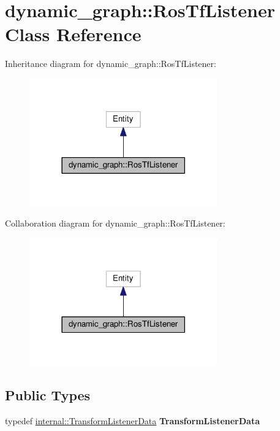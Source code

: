 \hypertarget{classdynamic__graph_1_1RosTfListener}{}\section{dynamic\+\_\+graph\+:\+:Ros\+Tf\+Listener Class Reference}
\label{classdynamic__graph_1_1RosTfListener}


Inheritance diagram for dynamic\+\_\+graph\+:\+:Ros\+Tf\+Listener\+:
\nopagebreak
\begin{figure}[H]
\begin{center}
\leavevmode
\includegraphics[width=230pt]{classdynamic__graph_1_1RosTfListener__inherit__graph}
\end{center}
\end{figure}


Collaboration diagram for dynamic\+\_\+graph\+:\+:Ros\+Tf\+Listener\+:
\nopagebreak
\begin{figure}[H]
\begin{center}
\leavevmode
\includegraphics[width=230pt]{classdynamic__graph_1_1RosTfListener__coll__graph}
\end{center}
\end{figure}
\subsection*{Public Types}
\begin{DoxyCompactItemize}
\item 
typedef \hyperlink{structdynamic__graph_1_1internal_1_1TransformListenerData}{internal\+::\+Transform\+Listener\+Data} {\bfseries Transform\+Listener\+Data}\hypertarget{classdynamic__graph_1_1RosTfListener_acdd29e75471c27a6c4d412781254352f}{}\label{classdynamic__graph_1_1RosTfListener_acdd29e75471c27a6c4d412781254352f}

\end{DoxyCompactItemize}
